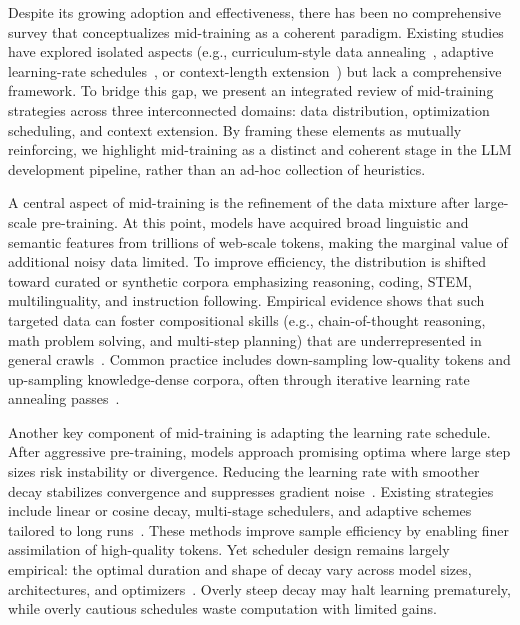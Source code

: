 Despite its growing adoption and effectiveness, there has been no comprehensive survey that conceptualizes mid-training as a coherent paradigm. Existing studies have explored isolated aspects (e.g., curriculum-style data annealing~\cite{du2024survey,wu2025data}, adaptive learning-rate schedules~\cite{jin2023rethinking}, or context-length extension~\cite{huang2023advancing, liu2025comprehensive, pawar2024and}) but lack a comprehensive framework. To bridge this gap, we present an integrated review of mid-training strategies across three interconnected domains: data distribution, optimization scheduling, and context extension. By framing these elements as mutually reinforcing, we highlight mid-training as a distinct and coherent stage in the LLM development pipeline, rather than an ad-hoc collection of heuristics.

A central aspect of mid-training is the refinement of the data mixture after large-scale pre-training. At this point, models have acquired broad linguistic and semantic features from trillions of web-scale tokens, making the marginal value of additional noisy data limited. To improve efficiency, the distribution is shifted toward curated or synthetic corpora emphasizing reasoning, coding, STEM, multilinguality, and instruction following. Empirical evidence shows that such targeted data can foster compositional skills (e.g., chain-of-thought reasoning, math problem solving, and multi-step planning) that are underrepresented in general crawls~\cite{abdin2024phi, allal2025smollm2}. Common practice includes down-sampling low-quality tokens and up-sampling knowledge-dense corpora, often through iterative learning rate annealing passes~\cite{NEURIPS2024_19e4ea30, penedo2024fineweb, Su2024NemotronCCTC}. 

Another key component of mid-training is adapting the learning rate schedule. After aggressive pre-training, models approach promising optima where large step sizes risk instability or divergence. Reducing the learning rate with smoother decay stabilizes convergence and suppresses gradient noise~\cite{you1908does, gilmer2022loss, kalra2024warmup}. Existing strategies include linear or cosine decay, multi-stage schedulers, and adaptive schemes tailored to long runs~\cite{goyal2017accurate, loshchilov2016sgdr, bi2024deepseek, hu2024minicpm, shen2024power, ibrahim2024simple}. These methods improve sample efficiency by enabling finer assimilation of high-quality tokens. Yet scheduler design remains largely empirical: the optimal duration and shape of decay vary across model sizes, architectures, and optimizers~\cite{kaplan2020scaling, hoffmann2022training, defazio2023optimal, bergsma2025straight, li2025predictable}. Overly steep decay may halt learning prematurely, while overly cautious schedules waste computation with limited gains.

